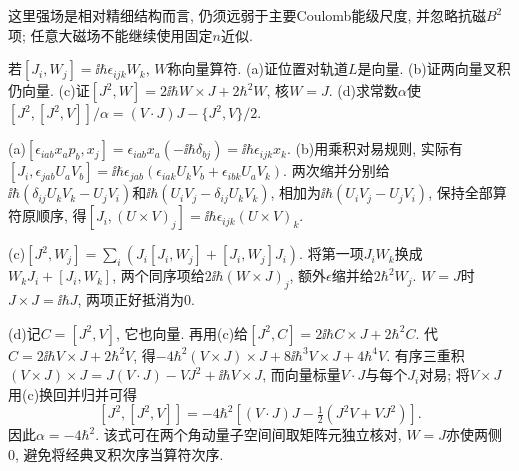 这里强场是相对精细结构而言, 仍须远弱于主要Coulomb能级尺度, 并忽略抗磁$B^2$项; 任意大磁场不能继续使用固定$n$近似.
\begin{exercise}
若$[J_i,W_j]=\ii\hbar\epsilon_{ijk}W_k$, $W$称向量算符. (a)证位置对轨道$L$是向量. (b)证两向量叉积仍向量. (c)证$[J^2,W]=2\ii\hbar W\times J+2\hbar^2W$, 核$W=J$. (d)求常数$\alpha$使$[J^2,[J^2,V]]/\alpha=(V\cdot J)J-\{J^2,V\}/2$.
\end{exercise}
\begin{solution}
(a)$[\epsilon_{iab}x_ap_b,x_j]=\epsilon_{iab}x_a(-\ii\hbar\delta_{bj})=\ii\hbar\epsilon_{ijk}x_k$. (b)用乘积对易规则, 实际有$[J_i,\epsilon_{jab}U_aV_b]=\ii\hbar\epsilon_{jab}(\epsilon_{iak}U_kV_b+\epsilon_{ibk}U_aV_k)$. 两次缩并分别给$\ii\hbar(\delta_{ij}U_kV_k-U_jV_i)$和$\ii\hbar(U_iV_j-\delta_{ij}U_kV_k)$, 相加为$\ii\hbar(U_iV_j-U_jV_i)$, 保持全部算符原顺序, 得$[J_i,(U\times V)_j]=\ii\hbar\epsilon_{ijk}(U\times V)_k$.

(c)$[J^2,W_j]=\sum_i(J_i[J_i,W_j]+[J_i,W_j]J_i)$. 将第一项$J_iW_k$换成$W_kJ_i+[J_i,W_k]$, 两个同序项给$2\ii\hbar(W\times J)_j$, 额外$\epsilon$缩并给$2\hbar^2W_j$. $W=J$时$J\times J=\ii\hbar J$, 两项正好抵消为0.

(d)记$C=[J^2,V]$, 它也向量. 再用(c)给$[J^2,C]=2\ii\hbar C\times J+2\hbar^2C$. 代$C=2\ii\hbar V\times J+2\hbar^2V$, 得$-4\hbar^2(V\times J)\times J+8\ii\hbar^3V\times J+4\hbar^4V$. 有序三重积$(V\times J)\times J=J(V\cdot J)-VJ^2+\ii\hbar V\times J$, 而向量标量$V\cdot J$与每个$J_i$对易; 将$V\times J$用(c)换回并归并可得
\[
[J^2,[J^2,V]]=-4\hbar^2\left[(V\cdot J)J-\tfrac12(J^2V+VJ^2)\right].
\]
因此$\alpha=-4\hbar^2$. 该式可在两个角动量子空间间取矩阵元独立核对, $W=J$亦使两侧0, 避免将经典叉积次序当算符次序.
\end{solution}
